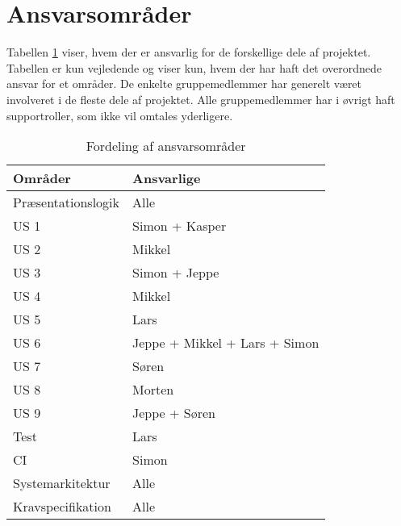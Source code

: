 \section{Ansvarsområder}
Tabellen \ref{fig:Ansvarstabel} viser, hvem der er ansvarlig for de forskellige dele af projektet. Tabellen er kun vejledende og viser kun, hvem der har haft det overordnede ansvar for et områder. De enkelte gruppemedlemmer har generelt været involveret i de fleste dele af projektet. Alle gruppemedlemmer har i øvrigt haft supportroller, som ikke vil omtales yderligere.  
\begin{table}[H]
	\begin{tabular}{ | l | p{5cm} |}
		\hline
		\textbf{Områder}  & \textbf{Ansvarlige} \\ \hline
		Præsentationslogik & Alle \\ \hline
		US 1 & Simon + Kasper \\ \hline
		US 2 & Mikkel \\ \hline
		US 3 & Simon + Jeppe \\ \hline
		US 4 & Mikkel \\ \hline
		US 5 & Lars \\ \hline
		US 6 & Jeppe + Mikkel + Lars + Simon \\ \hline
		US 7 & Søren \\ \hline	
		US 8 & Morten\\ \hline	
		US 9 & Jeppe + Søren\\ \hline	
		Test & Lars  \\ \hline
		CI & Simon \\ \hline
		Systemarkitektur & Alle \\ \hline	
		Kravspecifikation & Alle \\ \hline	
	\end{tabular}
	\caption{Fordeling af ansvarsområder}
	\label{fig:Ansvarstabel}
\end{table}